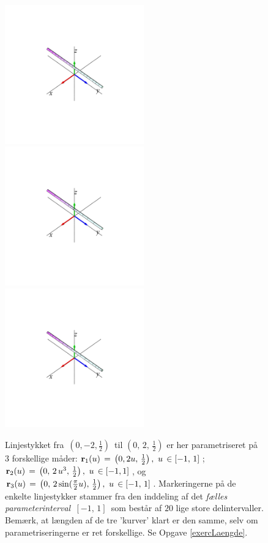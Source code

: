 \begin{figure}[ht]
\centerline{\includegraphics[height=60mm]{FIGS/plotIntLine1} \includegraphics[height=60mm]{FIGS/plotIntLine2} \includegraphics[height=60mm]{FIGS/plotIntLine3}}
\begin{center}
\caption{\small{Linjestykket fra $\, (0, -2,
\frac{1}{2})\, $ til $(0, \, 2, \, \frac{1}{2})$
er her parametriseret på 3 forskellige måder:
${\bf r}_{1}(u) \, = \, \left(0, 2u,
\,\frac{1}{2}\right), \, \, u \, \in [-1, \,1]\,
$; ${\bf r}_{2}(u) \, = \, \left(0, \,
2\,u^{3},\, \frac{1}{2}\right), \, \, u \, \in
[-1, 1]\, $, og ${\bf r}_{3}(u) \, = \, \left(0,
\, 2\sin(\frac{\pi}{2}u),\, \frac{1}{2}\right),
\, \, u \, \in [-1,\, 1]\, $.
Mar\-ke\-rin\-ger\-ne på de enkelte linjestykker
stammer fra den inddeling af det   {\em fælles
parameterinterval $\, [-1,\, 1]\,$} som består af
$20$ lige store delintervaller. Bemærk, at
længden af de tre 'kurver' klart er den samme,
selv om parametriseringerne er ret forskellige. Se Opgave \ref{exercLaengde}.}}
\label{FigIntLine123}
\end{center}
\end{figure}



